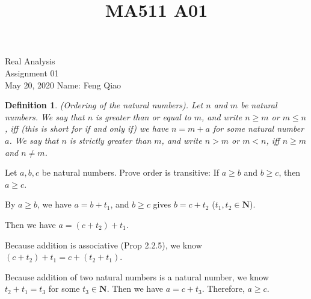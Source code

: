 \documentclass[12pt]{article}
\title{MA511 A01}
\newtheorem{defn}{Definition}
\begin{document}
\begin{flushleft}
{\sc \Large Real Analysis} \\ 
\medskip
Assignment 01\\
May 20, 2020
\hfill Name: Feng Qiao \\

\setdefaultleftmargin{0pt}{}{}{}{}{}


\begin{defn}
(Ordering of the natural numbers). Let \(n\) and \(m\) be natural numbers. We say that \(n\) is greater than or equal to \(m\), and write \(n \geq m\) or \(m \leq n\), iff (this is short for if and only if) we have \(n = m + a\) for some natural number \(a\).  We say that \(n\) is strictly greater than \(m\), and write \(n > m\) or \(m < n\), iff
\(n \geq m\) and \(n \neq m\).
\end{defn}

Let \(a, b, c\) be natural numbers. Prove order is transitive: If \(a \geq b\) and \(b \geq c\), then \(a \geq c\).

\end{flushleft}

\begin{doublespace}
By \(a \geq b\), we have \(a = b + t_1 \), and \(b \geq c \) gives \(b = c + t_2 \) (\(t_1, t_2 \in \mathbf{N} \)).

Then we have \(a = (c + t_2) + t_1 \).

Because addition is associative (Prop 2.2.5), we know \( (c+ t_2) + t_1 = c + (t_2 + t_1) \).

Because addition of two natural numbers is a natural number, we know \(t_2 + t_1 = t_3\) for some \(t_3 \in \mathbf{N}\). Then we have \(a = c + t_3 \). Therefore, \(a \geq c \).
\end{doublespace}
\end{document}
